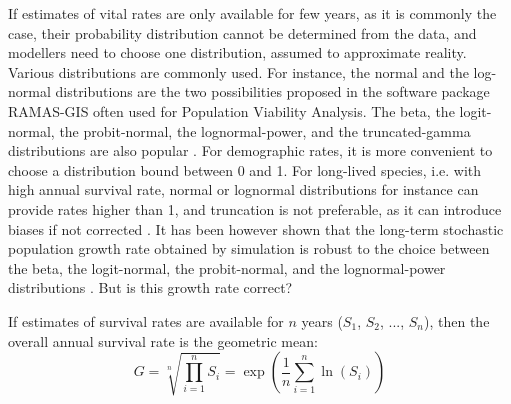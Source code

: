 \documentclass[preprint,authoryear,12pt]{elsarticle}
\begin{document}
If estimates of vital rates are only available for few years, as it is
commonly the case, their probability distribution cannot be determined
from the data, and modellers need to choose one distribution, assumed
to approximate reality. Various distributions are commonly used. For
instance, the normal \citep[e.g.,][]{winemiller_life_2002} and the
log-normal distributions are the two possibilities proposed in the
software package RAMAS-GIS \citep{akcakaya_ramas_2002} often used
for Population Viability Analysis. The beta, the logit-normal, the
probit-normal, the lognormal-power, and the truncated-gamma
distributions are also popular
\citep{kaye_effect_2003,samaranayaka_modelling_2010}. For demographic
rates, it is more
convenient to choose a distribution bound between 0 and 1. For
long-lived species, i.e. with high annual survival rate, normal or
lognormal distributions for instance can provide rates higher than 1,
and truncation is not preferable, as it can introduce biases if not
corrected \citep{kaye_effect_2003}. It has been
however shown that the long-term stochastic population growth rate
obtained by simulation is robust to the choice between the beta,
the logit-normal, the probit-normal, and the lognormal-power distributions
\citep{samaranayaka_modelling_2010}. But is this growth rate correct?

If estimates of survival rates are available for $n$ years ($S_1$,
$S_2$, ..., $S_n$), then the overall annual survival rate is the
geometric mean:
\[ G = \sqrt[n]{\prod_{i=1}^{n} S_{i}} = \exp(\frac{1}{n}\sum_{i=1}^{n}\ln(S_{i})) \]
\end{document}

